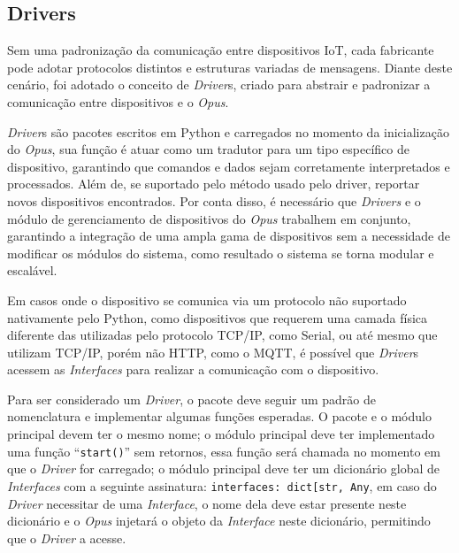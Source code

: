 \subsection{Drivers}

Sem uma padronização da comunicação entre dispositivos IoT, cada fabricante pode adotar protocolos distintos e estruturas variadas de 
mensagens. Diante deste cenário, foi adotado o conceito de \emph{Driver}s, criado para abstrair e padronizar a comunicação entre 
dispositivos e o \emph{Opus}.

\emph{Driver}s são pacotes escritos em Python e carregados no momento da inicialização do \emph{Opus},
sua função é atuar como um tradutor para um tipo específico de dispositivo, garantindo que 
comandos e dados sejam corretamente interpretados e processados. Além de, se suportado pelo método usado pelo driver, reportar
novos dispositivos encontrados. Por conta disso, é necessário que \emph{Drivers} e o módulo de gerenciamento de dispositivos do 
\emph{Opus} trabalhem em conjunto, garantindo a integração de uma ampla gama de dispositivos 
sem a necessidade de modificar os módulos do sistema, como resultado o sistema se torna modular e escalável.

Em casos onde o dispositivo se comunica via um protocolo não suportado nativamente pelo Python, como dispositivos que 
requerem uma camada física diferente das utilizadas pelo protocolo TCP/IP, como Serial, ou até mesmo que utilizam TCP/IP, 
porém não HTTP, como o MQTT, é possível que \emph{Driver}s acessem as \emph{Interfaces} para realizar a comunicação com o dispositivo.

Para ser considerado um \emph{Driver}, o pacote deve seguir um padrão de nomenclatura e implementar algumas funções esperadas.
O pacote e o módulo principal devem ter o mesmo nome; o módulo principal deve ter implementado uma função ``\lstinline{start()}'' sem retornos,
essa função será chamada no momento em que o \emph{Driver} for carregado; o módulo principal deve ter um dicionário global de 
\emph{Interfaces} com a seguinte assinatura: \lstinline{interfaces: dict[str, Any}, em caso do \emph{Driver} necessitar de uma \emph{Interface},
o nome dela deve estar presente neste dicionário e o \emph{Opus} injetará o objeto da \emph{Interface} neste dicionário,
permitindo que o \emph{Driver} a acesse.




%
